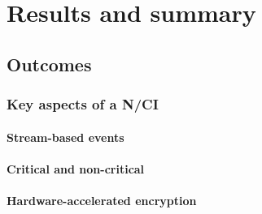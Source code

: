 \chapter{Results and summary}
\graphicspath{{Chapter5/Figs/}{Chapter5/Figs/}}


\section{Outcomes}
\label{chapter5-outomes}

\subsection{Key aspects of a N/CI}
\label{chapter5-key-aspects}

\subsubsection{Stream-based events}
\label{chapter5-stream-based-events}

\subsubsection{Critical and non-critical}
\label{chapter5-critical-and-non-critical}

\subsubsection{Hardware-accelerated encryption}
\label{chapter5-hardware-accelerated-encryption}

